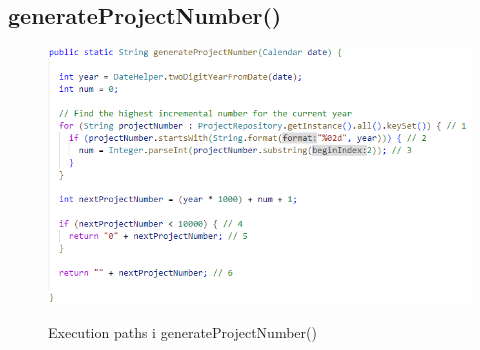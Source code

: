 \subsection{generateProjectNumber()} 
\begin{figure}[H]
    \centering
    \caption{Execution paths i generateProjectNumber()}
    \includegraphics[width = \textwidth, keepaspectratio]{ImplementationAndTest/Diagrams/wb_genProjNum.png}
    \label{fig:ep_generate_project_number}
\end{figure}

